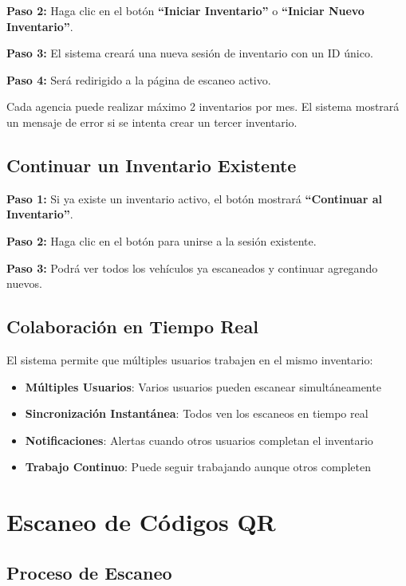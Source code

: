 \documentclass[11pt,a4paper]{article}
\newcommand{\step}[1]{\textbf{\color{primarytext}Paso #1:}}
\newcommand{\button}[1]{\textbf{#1}}
\begin{document}
\step{2} Haga clic en el botón \button{``Iniciar Inventario''} o \button{``Iniciar Nuevo Inventario''}.

\step{3} El sistema creará una nueva sesión de inventario con un ID único.

\step{4} Será redirigido a la página de escaneo activo.

\begin{infobox}
Cada agencia puede realizar máximo 2 inventarios por mes. El sistema mostrará un mensaje de error si se intenta crear un tercer inventario.
\end{infobox}

\subsection{Continuar un Inventario Existente}

\step{1} Si ya existe un inventario activo, el botón mostrará \button{``Continuar al Inventario''}.

\step{2} Haga clic en el botón para unirse a la sesión existente.

\step{3} Podrá ver todos los vehículos ya escaneados y continuar agregando nuevos.

\subsection{Colaboración en Tiempo Real}

El sistema permite que múltiples usuarios trabajen en el mismo inventario:

\begin{itemize}
    \item \textbf{Múltiples Usuarios}: Varios usuarios pueden escanear simultáneamente
    \item \textbf{Sincronización Instantánea}: Todos ven los escaneos en tiempo real
    \item \textbf{Notificaciones}: Alertas cuando otros usuarios completan el inventario
    \item \textbf{Trabajo Continuo}: Puede seguir trabajando aunque otros completen
\end{itemize}

\section{Escaneo de Códigos QR}

\subsection{Proceso de Escaneo}
\end{document}
